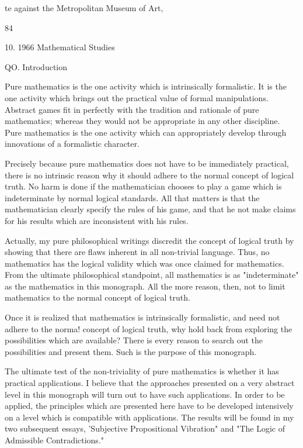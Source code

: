 \documentclass[10pt,twoside]{memoir}
\begin{document}
\begin{enumerate}
{{{{{{{{{{{{{{{{te against the Metropolitan Museum of Art, 


84 


10. 1966 Mathematical Studies 


QO. Introduction 


Pure mathematics is the one activity which is intrinsically formalistic. It 
is the one activity which brings out the practical value of formal 
manipulations. Abstract games fit in perfectly with the tradition and 
rationale of pure mathematics; whereas they would not be appropriate in 
any other discipline. Pure mathematics is the one activity which can 
appropriately develop through innovations of a formalistic character. 

Precisely because pure mathematics does not have to be immediately 
practical, there is no intrinsic reason why it should adhere to the normal 
concept of logical truth. No harm is done if the mathematician chooses to 
play a game which is indeterminate by normal logical standards. All that 
matters is that the mathematician clearly specify the rules of his game, and 
that he not make claims for his results which are inconsistent with his rules. 

Actually, my pure philosophical writings discredit the concept of 
logical truth by showing that there are flaws inherent in all non-trivial 
language. Thus, no mathematics has the logical validity which was once 
claimed for mathematics. From the ultimate philosophical standpoint, all 
mathematics is as "indeterminate" as the mathematics in this monograph. 
All the more reason, then, not to limit mathematics to the normal concept 
of logical truth. 

Once it is realized that mathematics is intrinsically formalistic, and need 
not adhere to the norma! concept of logical truth, why hold back from 
exploring the possibilities which are available? There is every reason to 
search out the possibilities and present them. Such is the purpose of this 
monograph. 

The ultimate test of the non-triviality of pure mathematics is whether it 
has practical applications. I believe that the approaches presented on a very 
abstract level in this monograph will turn out to have such applications. In 
order to be applied, the principles which are presented here have to be 
developed intensively on a level which is compatible with applications. The 
results will be found in my two subsequent essays, 'Subjective Propositional 
Vibration" and "The Logic of Admissible Contradictions." 


}}}}}}}}}}}}}}}}
\end{enumerate}
\end{document}
